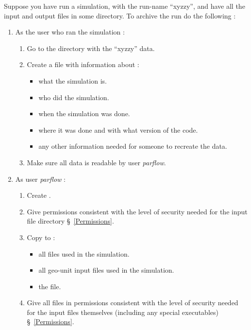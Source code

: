 Suppose you have run a simulation, with the run-name ``xyzzy'', and have
all the input and output files in some directory.
To archive the run do the following :
\begin{enumerate}
\item As the user who ran the simulation :
      \begin{enumerate}
      \item Go to the directory with the ``xyzzy'' data.
      \item Create a  file with information about :
            \begin{itemize}
            \item what the simulation is.
            \item who did the simulation.
            \item when the simulation was done.
            \item where it was done and with what version of the code.
            \item any other information needed for someone to recreate the data.
            \end{itemize}
      \item Make sure all data is readable by user {\it parflow}.
      \end{enumerate}
\item As user {\it parflow} :
      \begin{enumerate}
      \item Create .
      \item Give  permissions consistent
            with the level of security needed for the input file directory
            \S~\ref{Permissions}.
      \item Copy to  :
            \begin{itemize}
            \item all  files used in the simulation.
            \item all geo-unit input files used in the simulation.
            \item the  file.
            \end{itemize}
      \item Give all files in  permissions
            consistent with the level of security needed for the input files
            themselves (including any special executables)
            \S~\ref{Permissions}.

\end{enumerate}
\end{enumerate}

